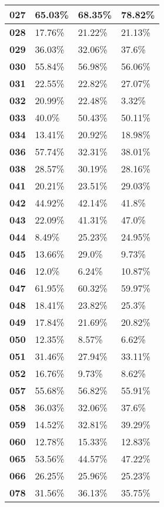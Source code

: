 \documentclass[12pt,a4paper]{article}
\begin{document}
\begin{longtable}{|p{}|p{}|p{}|p{}|}
\hline \textbf{027} & 65.03\% & 68.35\% & 78.82\% \\
\hline \textbf{028} & 17.76\% & 21.22\% & 21.13\% \\
\hline \textbf{029} & 36.03\% & 32.06\% & 37.6\% \\
\hline \textbf{030} & 55.84\% & 56.98\% & 56.06\% \\
\hline \textbf{031} & 22.55\% & 22.82\% & 27.07\% \\
\hline \textbf{032} & 20.99\% & 22.48\% & 3.32\% \\
\hline \textbf{033} & 40.0\% & 50.43\% & 50.11\% \\
\hline \textbf{034} & 13.41\% & 20.92\% & 18.98\% \\
\hline \textbf{036} & 57.74\% & 32.31\% & 38.01\% \\
\hline \textbf{038} & 28.57\% & 30.19\% & 28.16\% \\
\hline \textbf{041} & 20.21\% & 23.51\% & 29.03\% \\
\hline \textbf{042} & 44.92\% & 42.14\% & 41.8\% \\
\hline \textbf{043} & 22.09\% & 41.31\% & 47.0\% \\
\hline \textbf{044} & 8.49\% & 25.23\% & 24.95\% \\
\hline \textbf{045} & 13.66\% & 29.0\% & 9.73\% \\
\hline \textbf{046} & 12.0\% & 6.24\% & 10.87\% \\
\hline \textbf{047} & 61.95\% & 60.32\% & 59.97\% \\
\hline \textbf{048} & 18.41\% & 23.82\% & 25.3\% \\
\hline \textbf{049} & 17.84\% & 21.69\% & 20.82\% \\
\hline \textbf{050} & 12.35\% & 8.57\% & 6.62\% \\
\hline \textbf{051} & 31.46\% & 27.94\% & 33.11\% \\
\hline \textbf{052} & 16.76\% & 9.73\% & 8.62\% \\
\hline \textbf{057} & 55.68\% & 56.82\% & 55.91\% \\
\hline \textbf{058} & 36.03\% & 32.06\% & 37.6\% \\
\hline \textbf{059} & 14.52\% & 32.81\% & 39.29\% \\
\hline \textbf{060} & 12.78\% & 15.33\% & 12.83\% \\
\hline \textbf{065} & 53.56\% & 44.57\% & 47.22\% \\
\hline \textbf{066} & 26.25\% & 25.96\% & 25.23\% \\
\hline \textbf{078} & 31.56\% & 36.13\% & 35.75\% \\

\end{longtable}
\end{document}
